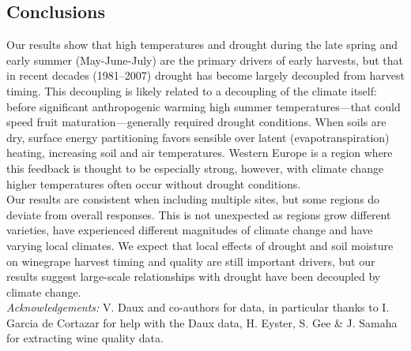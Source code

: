 \documentclass[portrait,a0,final] {a0poster} %
\begin{document}
\begin{multicols}{2}
\section*{Conclusions}
Our results show that high temperatures and drought during the late spring and early summer (May-June-July) are the primary drivers of early harvests, but that in recent decades (1981--2007) drought has become largely decoupled from harvest timing. This decoupling is likely related to a decoupling of the climate itself: before significant anthropogenic warming high summer temperatures---that could speed fruit maturation---generally required drought conditions. When soils are dry, surface energy partitioning favors sensible over latent (evapotranspiration) heating, increasing soil and air temperatures. Western Europe is a region where this feedback is thought to be especially strong, however, with climate change higher temperatures often occur without drought conditions.\\ 

Our results are consistent when including multiple sites, but some regions do deviate from overall responses. This is not unexpected as regions grow different varieties, have experienced different magnitudes of climate change and have varying local climates. We expect that local effects of drought and soil moisture on winegrape harvest timing and quality are still important drivers, but our results suggest large-scale relationships with drought have been decoupled by climate change. \\

\emph{Acknowledgements:} V. Daux and co-authors for data, in particular thanks to I. Garcia de Cortazar for help with the Daux data, H. Eyster, S. Gee \& J. Samaha for extracting wine quality data.\\


{\def\section*#1{}

}

\end{multicols}
\end{document}
